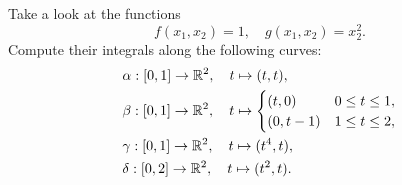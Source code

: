 \documentclass[11pt]{article}
\begin{document}
\begin{exercise}
    Take a look at the functions 
    \[
        f(x_1,x_2) = 1, \quad g(x_1,x_2) = x_2^2.
    \]
    Compute their integrals along the following curves:
    \begin{align*}
        &\alpha : [0,1] \to \mathbb{R}^2, \quad t \mapsto (t,t),
        \\
        &\beta  : [0,1] \to \mathbb{R}^2, \quad t \mapsto \begin{cases} (t,0) & 0 \leq t \leq 1, \\ (0,t-1) & 1 \leq t \leq 2, \end{cases}
        \\
        &\gamma : [0,1] \to \mathbb{R}^2, \quad t \mapsto (t^4,t),
        \\
        &\delta : [0,2] \to \mathbb{R}^2, \quad t \mapsto (t^2,t).
    \end{align*}
\end{exercise}
\end{document}
